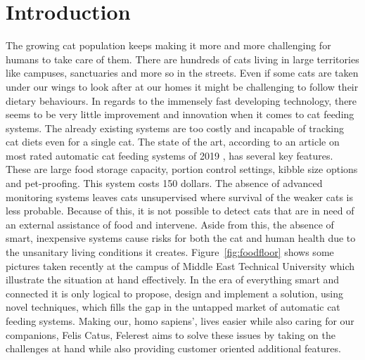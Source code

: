 \section{Introduction} \label{sec:intro}



The growing cat population keeps making it more and more challenging for humans to take care of them. There are hundreds of cats living in large territories like campuses, sanctuaries and more so in the streets. Even if some cats are taken under our wings to look after at our homes it might be challenging to follow their dietary behaviours. In regards to the immensely fast developing technology, there seems to be very little improvement and innovation when it comes to cat feeding systems. The already existing systems are too costly and incapable of tracking cat diets even for a single cat. The state of the art, according to an article on most rated automatic cat feeding systems of 2019 \cite{cite:SOTA}, has several key features. These are large food storage capacity, portion control settings, kibble size options and pet-proofing. This system costs 150 dollars. The absence of advanced monitoring systems leaves cats unsupervised where survival of the weaker cats is less probable. Because of this, it is not possible to detect cats that are in need of an external assistance of food and intervene. Aside from this, the absence of smart, inexpensive systems cause risks for both the cat and human health due to the unsanitary living conditions it creates. Figure~\ref{fig:foodfloor} shows some pictures taken recently at the campus of Middle East Technical University which illustrate the situation at hand effectively. In the era of everything smart and connected it is only logical to propose, design and implement a solution, using novel techniques, which fills the gap in the untapped market of automatic cat feeding systems. Making our, homo sapiens', lives easier while also caring for our companions, Felis Catus, Felerest aims to solve these issues by taking on the challenges at hand while also providing customer oriented additional features.

